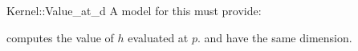 \begin{ccRefFunctionObjectConcept}{Kernel::Value_at_d}
A model for this must provide:


 {computes the value of $h$ evaluated
  at $p$. \ccPrecond {} and  have the same dimension.}

\end{ccRefFunctionObjectConcept}
